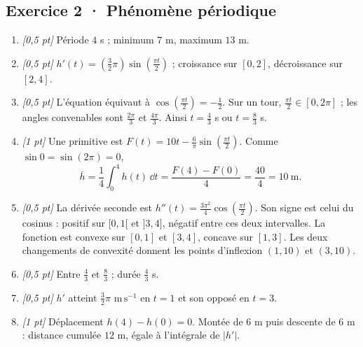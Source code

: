 \subsection*{Exercice 2 · Phénomène périodique}\begin{enumerate}

\item \textit{[0,5 pt]} Période $4$ s ; minimum $7$ m, maximum $13$ m.

\item \textit{[0,5 pt]} $h'(t)=(\frac{3}{2}\pi)\sin (\frac{\pi t}{2})$ ; croissance sur $[0,2]$, décroissance sur $[2,4]$.

\item \textit{[0,5 pt]} L'équation équivaut à $\cos (\frac{\pi t}{2})=-\frac{1}{2}$. Sur un tour, $\frac{\pi t}{2}\in[0,2\pi]$ ; les angles convenables sont $\frac{2\pi}{3}$ et $\frac{4\pi}{3}$. Ainsi $t=\frac{4}{3}$ s ou $t=\frac{8}{3}$ s.

\item \textit{[1 pt]} Une primitive est $F(t)=10t-\frac{6}{\pi}\sin (\frac{\pi t}{2})$. Comme $\sin0=\sin(2\pi)=0$,
\[\overline h=\frac{1}{4}\int_0^{4}h(t)\,\dd t=\frac{F(4)-F(0)}{4}=\frac{40}{4}=10\ \mathrm{m}.\]

\item \textit{[0,5 pt]} La dérivée seconde est $h''(t)=\frac{3\pi^2}{4}\cos (\frac{\pi t}{2})$. Son signe est celui du cosinus : positif sur $[0,1[$ et $]3,4]$, négatif entre ces deux intervalles. La fonction est convexe sur $[0,1]$ et $[3,4]$, concave sur $[1,3]$. Les deux changements de convexité donnent les points d'inflexion $(1,10)$ et $(3,10)$.

\item \textit{[0,5 pt]} Entre $\frac{4}{3}$ et $\frac{8}{3}$ ; durée $\frac{4}{3}$ s.

\item \textit{[0,5 pt]} $h'$ atteint $\frac{3}{2}\pi$ $\mathrm{m\,s^{-1}}$ en $t=1$ et son opposé en $t=3$.

\item \textit{[1 pt]} Déplacement $h(4)-h(0)=0$. Montée de $6$ m puis descente de $6$ m : distance cumulée $12$ m, égale à l'intégrale de $|h'|$.

\end{enumerate}

